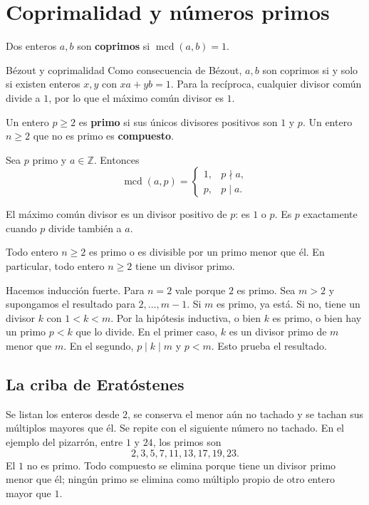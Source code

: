 \section{Coprimalidad y números primos}
\begin{definicion}[{title={Enteros coprimos}}]
Dos enteros $a,b$ son \textbf{coprimos} si $\operatorname{mcd}(a,b)=1$.
\end{definicion}
\begin{nota}{Bézout y coprimalidad}
Como consecuencia de Bézout, $a,b$ son coprimos si y solo si existen enteros $x,y$ con $xa+yb=1$. Para la recíproca, cualquier divisor común divide a $1$, por lo que el máximo común divisor es $1$.
\end{nota}
\begin{definicion}[{title={Número primo}}]
Un entero $p\geq2$ es \textbf{primo} si sus únicos divisores positivos son $1$ y $p$. Un entero $n\geq2$ que no es primo es \textbf{compuesto}.
\end{definicion}
\begin{proposicion}[{title={Lema}}]
Sea $p$ primo y $a\in\mathbb Z$. Entonces
\[
\operatorname{mcd}(a,p)=\begin{cases}1,&p\nmid a,\\p,&p\mid a.\end{cases}
\]
\end{proposicion}
\begin{demostracion}
El máximo común divisor es un divisor positivo de $p$: es $1$ o $p$. Es $p$ exactamente cuando $p$ divide también a $a$.
\end{demostracion}
\begin{proposicion}[{title={Lema: existencia de un divisor primo}}]
Todo entero $n\geq2$ es primo o es divisible por un primo menor que él. En particular, todo entero $n\geq2$ tiene un divisor primo.
\end{proposicion}
\begin{demostracion}
Hacemos inducción fuerte. Para $n=2$ vale porque $2$ es primo. Sea $m>2$ y supongamos el resultado para $2,\dots,m-1$.
Si $m$ es primo, ya está. Si no, tiene un divisor $k$ con $1<k<m$. Por la hipótesis inductiva, o bien $k$ es primo, o bien hay un primo $p<k$ que lo divide. En el primer caso, $k$ es un divisor primo de $m$ menor que $m$. En el segundo, $p\mid k\mid m$ y $p<m$. Esto prueba el resultado.
\end{demostracion}
\subsection{La criba de Eratóstenes}
Se listan los enteros desde $2$, se conserva el menor aún no tachado y se tachan sus múltiplos mayores que él. Se repite con el siguiente número no tachado. En el ejemplo del pizarrón, entre $1$ y $24$, los primos son
\[
2,3,5,7,11,13,17,19,23.
\]
El $1$ no es primo. Todo compuesto se elimina porque tiene un divisor primo menor que él; ningún primo se elimina como múltiplo propio de otro entero mayor que $1$.

